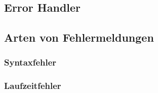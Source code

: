 \subsection{Error Handler}
\subsection{Arten von Fehlermeldungen}
\subsubsection{Syntaxfehler}
\subsubsection{Laufzeitfehler}

